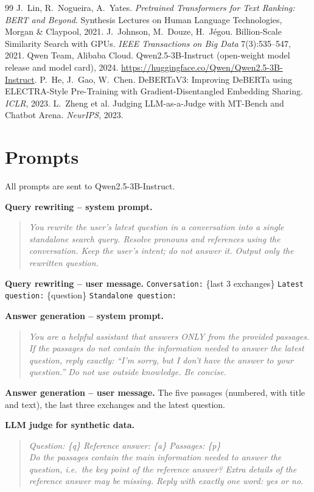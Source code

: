 \documentclass[11pt,a4paper]{report}
\begin{document}
\begin{thebibliography}{99}
 J.~Lin, R.~Nogueira, A.~Yates. \emph{Pretrained Transformers for Text Ranking: BERT and Beyond}. Synthesis Lectures on Human Language Technologies, Morgan \& Claypool, 2021.
 J.~Johnson, M.~Douze, H.~J\'egou. Billion-Scale Similarity Search with GPUs. \emph{IEEE Transactions on Big Data} 7(3):535--547, 2021.
 Qwen Team, Alibaba Cloud. Qwen2.5-3B-Instruct (open-weight model release and model card), 2024. \url{https://huggingface.co/Qwen/Qwen2.5-3B-Instruct}.
 P.~He, J.~Gao, W.~Chen. DeBERTaV3: Improving DeBERTa using ELECTRA-Style Pre-Training with Gradient-Disentangled Embedding Sharing. \emph{ICLR}, 2023.
 L.~Zheng et al. Judging LLM-as-a-Judge with MT-Bench and Chatbot Arena. \emph{NeurIPS}, 2023.
\end{thebibliography}

\appendix
\chapter{Prompts}\label{app:prompts}
All prompts are sent to Qwen2.5-3B-Instruct.

\textbf{Query rewriting -- system prompt.}
\begin{quote}\itshape
You rewrite the user's latest question in a conversation into a single standalone search query. Resolve pronouns and references using the conversation. Keep the user's intent; do not answer it. Output only the rewritten question.
\end{quote}
\textbf{Query rewriting -- user message.} \texttt{Conversation:} \{last 3 exchanges\} \texttt{Latest question:} \{question\} \texttt{Standalone question:}

\textbf{Answer generation -- system prompt.}
\begin{quote}\itshape
You are a helpful assistant that answers ONLY from the provided passages. If the passages do not contain the information needed to answer the latest question, reply exactly: ``I'm sorry, but I don't have the answer to your question.'' Do not use outside knowledge. Be concise.
\end{quote}
\textbf{Answer generation -- user message.} The five passages (numbered, with title and text), the last three exchanges and the latest question.

\textbf{LLM judge for synthetic data.}
\begin{quote}\itshape
Question: \{q\} \quad Reference answer: \{a\} \quad Passages: \{p\}\\
Do the passages contain the main information needed to answer the question, i.e.\ the key point of the reference answer? Extra details of the reference answer may be missing. Reply with exactly one word: yes or no.
\end{quote}
\end{document}
